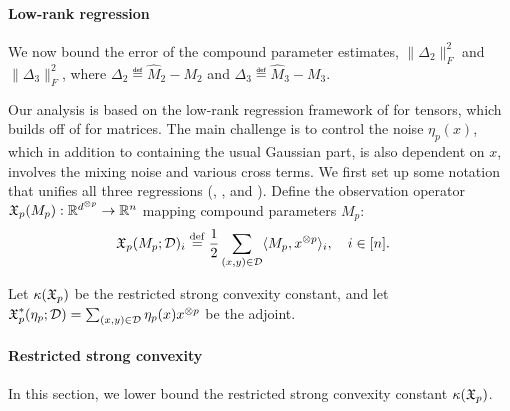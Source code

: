 \paragraph{Low-rank regression}
\vspace{-0.5em}
We now bound the error of
the compound parameter estimates,
$\|\Delta_2\|_F^2$ and $\|\Delta_3\|_F^2$,
where $\Delta_2 \eqdef \hat M_2 - M_2$
and $\Delta_3 \eqdef \hat M_3 - M_3$.

Our analysis is based on the low-rank regression framework of
\citet{Tomioka2011} for tensors, which builds off of
\citet{NegahbanWainwright2009} for matrices.
The main challenge is to control the noise $\eta_p(x)$,
which in addition to containing the usual Gaussian part, is also dependent on
$x$, involves the mixing noise and various cross terms.
We first set up some notation that unifies all three regressions (, , and ).
Define the observation operator $\operatorname{\mathfrak{X}}_p(M_p) : \mathbb{R}^{d^{\otimes p}} \to \mathbb{R}^{n}$
mapping compound parameters $M_p$:
\begin{align}
\operatorname{\mathfrak{X}}_p(M_p; \mathcal{D})_i &\stackrel{\rm def}{=} \frac12 \sum_{(x,y) \in \mathcal{D}} \langle M_p, x^{\otimes p} \rangle_i, \quad i  \in [n].
\end{align}

Let $\kappa(\operatorname{\mathfrak{X}}_p)$ be the restricted strong convexity constant,
and let $\operatorname{\mathfrak{X}}^*_p(\eta_p; \mathcal{D}) = \sum_{(x,y) \in \mathcal{D}} \eta_p(x) x^{\otimes p}$
be the adjoint.

\paragraph{Restricted strong convexity}

In this section, we lower bound the restricted strong convexity constant
$\kappa(\operatorname{\mathfrak{X}}_p)$.



